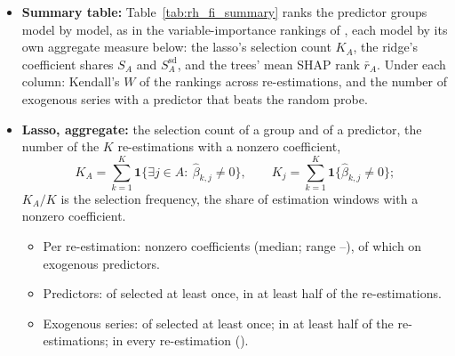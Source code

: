 \begin{itemize}
\begin{itemize}
  \end{itemize}
\item \textbf{Summary table:} Table~\ref{tab:rh_fi_summary} ranks the predictor groups model by model, as in the
  variable-importance rankings of \citet{gu2020empirical}, each model by its own aggregate measure below: the lasso's
  selection count $K_A$, the ridge's coefficient shares $S_A$ and $S^{\mathrm{sd}}_A$, and the trees' mean SHAP rank
  $\bar r_A$. Under each column: Kendall's $W$ of the rankings across re-estimations, and the number of exogenous
  series with a predictor that beats the random probe.

\item \textbf{Lasso, aggregate:} the selection count of a group and of a predictor, the number of the $K$
  re-estimations with a nonzero coefficient,
  \[
    K_A = \sum_{k=1}^{K} \mathbf{1}\bigl\{\exists j \in A:\ \hat\beta_{k,j} \ne 0\bigr\}, \qquad
    K_j = \sum_{k=1}^{K} \mathbf{1}\bigl\{\hat\beta_{k,j} \ne 0\bigr\};
  \]
  $K_A / K$ is the selection frequency, the share of estimation windows with a nonzero coefficient.
  \begin{itemize}
  \item Per re-estimation: \rhfiLassoNzMed{} nonzero coefficients (median; range \rhfiLassoNzMin--\rhfiLassoNzMax), of
    which \rhfiLassoExogNzMed{} on exogenous predictors.
  \item Predictors: \rhfiLassoColsEver{} of \rhfiP{} selected at least once, \rhfiLassoColsMajority{} in at least half
    of the re-estimations.
  \item Exogenous series: \rhfiLassoExogEver{} of \rhfiNExog{} selected at least once; \rhfiLassoExogMajority{} in at
    least half of the re-estimations; \rhfiLassoExogAlways{} in every re-estimation (\rhfiLassoAlwaysList).

\end{itemize}
\end{itemize}
